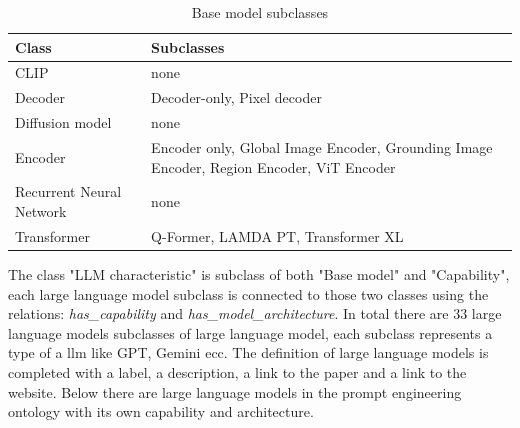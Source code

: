 \begin{table}[H]
    \centering
    \begin{tabular}{|>{\raggedright\arraybackslash}p{6cm}|>{\raggedright\arraybackslash}p{6cm}|}
        \hline
        \textbf{Class} & \textbf{Subclasses} \\ \hline
         CLIP & none \\ \hline
         
         Decoder & Decoder-only, Pixel decoder \\ \hline
         
         Diffusion model & none \\ \hline
         
         Encoder & Encoder only, Global Image Encoder, Grounding Image Encoder, Region Encoder, ViT Encoder \\ \hline
         
         Recurrent Neural Network & none \\ \hline

        Transformer & Q-Former, LAMDA PT, Transformer XL \\ \hline
    \end{tabular}
    \caption{Base model subclasses}
\end{table}
The class "LLM characteristic" is subclass of both "Base model" and "Capability", each large language model subclass is connected to those two classes using the relations: \textit{has\_capability} and \textit{has\_model\_architecture}. In total there are 33 large language models subclasses of large language model, each subclass represents a type of a llm like GPT, Gemini ecc. The definition of large language models is completed with a label, a description, a link to the paper and a link to the website. Below there are large language models in the prompt engineering ontology with its own capability and architecture.
